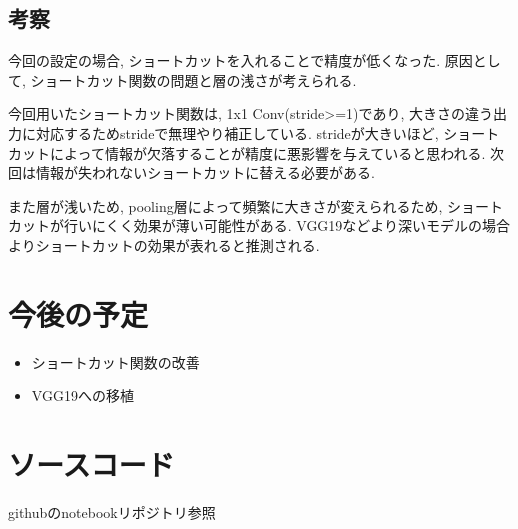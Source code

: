 \documentclass[twocolumn]{jarticle}     %
\begin{document}
\subsection{考察}
今回の設定の場合, ショートカットを入れることで精度が低くなった.
原因として, ショートカット関数の問題と層の浅さが考えられる.

今回用いたショートカット関数は, 1x1 Conv(stride>=1)であり, 大きさの違う出力に対応するためstrideで無理やり補正している. strideが大きいほど, ショートカットによって情報が欠落することが精度に悪影響を与えていると思われる.
次回は情報が失われないショートカットに替える必要がある.

また層が浅いため, pooling層によって頻繁に大きさが変えられるため, ショートカットが行いにくく効果が薄い可能性がある. VGG19などより深いモデルの場合よりショートカットの効果が表れると推測される.

\section{今後の予定}

\begin{itemize}
  \item ショートカット関数の改善
  \item VGG19への移植
\end{itemize}

\section{ソースコード}
githubのnotebookリポジトリ参照



\end{document}
